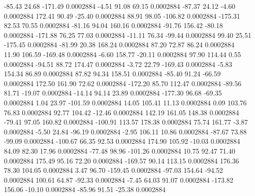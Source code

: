       -85.43       24.68     -171.49     0.0002884
       -4.51       91.08       69.15     0.0002884
      -87.37       24.12       -4.60     0.0002884
      172.41       90.49      -25.40     0.0002884
       88.91       98.05     -106.82     0.0002884
     -175.31       82.53       70.55     0.0002884
      -81.16       94.04      160.16     0.0002884
      -91.76      156.42      -80.18     0.0002884
     -171.88       76.25       77.03     0.0002884
      -11.11       76.34      -99.44     0.0002884
       99.40       25.51     -175.45     0.0002884
      -81.99       20.38      168.24     0.0002884
       87.20       72.87       86.24     0.0002884
       11.90      106.59     -169.48     0.0002884
       -6.60      158.77      -20.11     0.0002884
       97.90      114.44        0.55     0.0002884
      -94.51       88.72      174.47     0.0002884
       -3.72       22.79     -169.43     0.0002884
       -5.83      154.34       86.89     0.0002884
       87.82       94.34      158.51     0.0002884
      -85.40       91.24      -66.59     0.0002884
      172.50      161.90       72.62     0.0002884
     -172.20       85.70      112.47     0.0002884
      -89.56       81.71      -19.07     0.0002884
      -14.14       94.14       23.89     0.0002884
     -177.30       96.68      -69.35     0.0002884
        1.04       23.97     -101.59     0.0002884
       14.05      105.41       11.13     0.0002884
        0.09      103.76       76.83     0.0002884
       92.77      104.42      -12.46     0.0002884
      142.19      161.05      148.38     0.0002884
      -79.41       97.05      160.82     0.0002884
     -100.91      113.57      178.38     0.0002884
       75.74      161.77       -3.87     0.0002884
       -5.50       24.84      -96.19     0.0002884
       -2.95      106.11       10.86     0.0002884
      -87.67       73.88      -99.09     0.0002884
     -100.67       66.35       92.53     0.0002884
      174.90      105.92      -10.03     0.0002884
       84.09       82.30       17.96     0.0002884
      -77.48       98.96     -101.26     0.0002884
       10.75       92.47       71.40     0.0002884
      175.49       95.16       72.20     0.0002884
     -169.57       90.14      113.15     0.0002884
      176.36       78.30      104.05     0.0002884
        3.47       96.70     -159.45     0.0002884
      -97.03      154.64      -94.52     0.0002884
      100.61       64.87      -92.33     0.0002884
       -7.45       64.03       91.07     0.0002884
     -173.82      156.06      -10.10     0.0002884
      -85.96       91.51      -25.38     0.0002884
